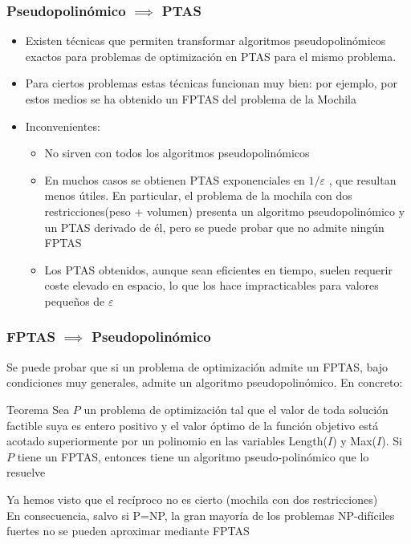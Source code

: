 \documentclass{beamer}
\begin{document}
\begin{frame}
	\frametitle{Pseudopolinómico $\implies$ PTAS }
	\begin{itemize}
		\item Existen técnicas que permiten transformar algoritmos pseudopolinómicos exactos para problemas de optimización en PTAS para el mismo problema.
		\item Para ciertos problemas estas técnicas funcionan muy bien: por ejemplo, por estos medios se ha obtenido un FPTAS del problema de la Mochila 
		\item Inconvenientes:
		\begin{itemize}
		\item No sirven con todos los algoritmos pseudopolinómicos
		\item  En muchos casos se obtienen PTAS exponenciales en $1/\varepsilon$ , que resultan menos útiles. En particular, el problema de la mochila con dos restricciones(peso + volumen) presenta un algoritmo pseudopolinómico y un PTAS derivado de él, pero se puede probar que no admite ningún FPTAS 
		\item Los PTAS obtenidos, aunque sean eficientes en tiempo, suelen requerir coste elevado en espacio, lo que los hace impracticables para valores pequeños de $\varepsilon$
		\end{itemize}
	\end{itemize}
\end{frame}

\begin{frame}
	\frametitle{FPTAS $\implies$ Pseudopolinómico}
		Se puede probar que si un problema de optimización admite un FPTAS, bajo condiciones muy generales,  admite un algoritmo pseudopolinómico. En concreto:
		\begin{block}{Teorema}
			Sea $P$ un problema de optimización tal que el valor de toda solución factible suya es entero positivo y el valor óptimo de la función objetivo está acotado superiormente por un polinomio en las variables Length($I$) y Max($I$). Si $P$ tiene un FPTAS, entonces tiene un algoritmo pseudo-polinómico que lo resuelve
		\end{block}
		 Ya hemos visto que el recíproco no es cierto (mochila con dos restricciones)\\
		En consecuencia, salvo si P=NP, la gran mayoría de los problemas NP-difíciles fuertes no se pueden aproximar mediante FPTAS
\end{frame}
\end{document}
